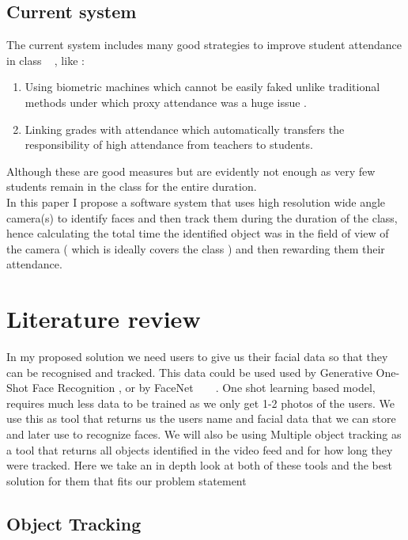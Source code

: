 \documentclass[10pt,twocolumn,letterpaper]{article}
\begin{document}
\subsection{Current system}

The current system includes many good strategies to improve student attendance in class ~\cite{b1} , like :\begin{enumerate}
\item  Using biometric machines which cannot be easily faked unlike traditional methods under which proxy attendance was a huge issue . \item Linking grades with attendance which automatically transfers the responsibility of high attendance from teachers to students.\end{enumerate}
Although these are good measures but are evidently not enough as very few students remain in the class for the entire duration.\\
In this paper I propose a software system that uses high resolution wide angle camera(s) to identify faces and then track them during the duration of the class, hence calculating the total time the identified object was in the field
of view of the camera ( which is ideally covers the class ) and then rewarding them their attendance.


\section{Literature review}
In my proposed solution we need users to give us their facial data so that they can be recognised and tracked. This data could be used used by Generative One-Shot Face Recognition , or by FaceNet  ~\cite{b2}  ~\cite{b3} . One shot learning based model, requires much less data to be trained as we only get 1-2 photos of the users. We use this as tool that returns us the users name and facial data that we can store and later use to recognize faces. We will also be using Multiple object tracking as a tool that returns all objects identified in the video feed and for how long they were tracked. Here we take an in depth look at both of these tools and the best solution for them that fits our problem statement



\subsection{Object Tracking }
\end{document}
